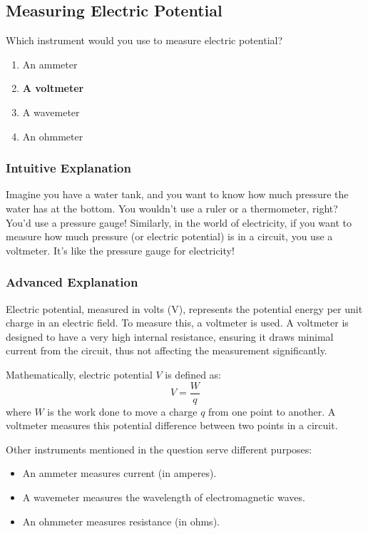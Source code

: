 \subsection{Measuring Electric Potential}
\label{T7D01}

\begin{tcolorbox}[colback=gray!10!white,colframe=black!75!black,title=T7D01]
Which instrument would you use to measure electric potential?  
\begin{enumerate}[label=\Alph*)]
    \item An ammeter
    \item \textbf{A voltmeter}
    \item A wavemeter
    \item An ohmmeter
\end{enumerate}
\end{tcolorbox}

\subsubsection{Intuitive Explanation}
Imagine you have a water tank, and you want to know how much pressure the water has at the bottom. You wouldn’t use a ruler or a thermometer, right? You’d use a pressure gauge! Similarly, in the world of electricity, if you want to measure how much pressure (or electric potential) is in a circuit, you use a voltmeter. It’s like the pressure gauge for electricity!

\subsubsection{Advanced Explanation}
Electric potential, measured in volts (V), represents the potential energy per unit charge in an electric field. To measure this, a voltmeter is used. A voltmeter is designed to have a very high internal resistance, ensuring it draws minimal current from the circuit, thus not affecting the measurement significantly. 

Mathematically, electric potential \( V \) is defined as:
\[
V = \frac{W}{q}
\]
where \( W \) is the work done to move a charge \( q \) from one point to another. A voltmeter measures this potential difference between two points in a circuit.

Other instruments mentioned in the question serve different purposes:
\begin{itemize}
    \item An ammeter measures current (in amperes).
    \item A wavemeter measures the wavelength of electromagnetic waves.
    \item An ohmmeter measures resistance (in ohms).
\end{itemize}

